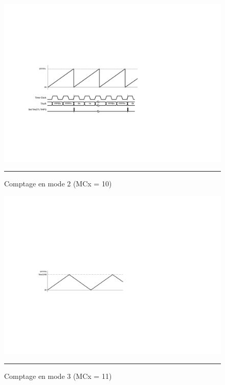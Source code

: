 \begin{figure}[H]
  \centering
  \includegraphics[angle=0, width=14cm]{./Figures/Chap5_Timer/Timer_Mode_2.pdf}
  \rule{35em}{0.5pt}
  \caption[TimerA Mode 2]{Comptage en mode 2 (MCx = 10)}
  \label{fig:TimerAmode2}
\end{figure}

\begin{figure}[H]
  \centering
  \includegraphics[angle=0, width=12cm]{./Figures/Chap5_Timer/Timer_Mode_3a.pdf}
  \rule{35em}{0.5pt}
  \caption[TimerA Mode 3]{Comptage en mode 3 (MCx = 11)}
  \label{fig:TimerAmode3a}
\end{figure}

